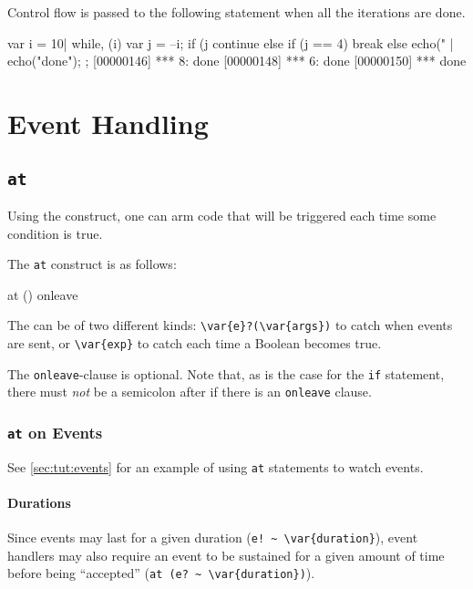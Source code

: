 Control flow is passed to the following statement when all the iterations
are done.

\begin{urbiscript}
{
  var i = 10|
  while, (i)
  {
    var j = --i;
    if (j %
      continue
    else if (j == 4)
      break
    else
      echo("%
  }|
  echo("done");
};
[00000146] *** 8: done
[00000148] *** 6: done
[00000150] *** done
\end{urbiscript}


\section{Event Handling}

\subsection{\lstinline{at}}
\label{sec:lang:at}
Using the  construct, one can arm code that will be
triggered each time some condition is true.

The \lstinline{at} construct is as follows:

\begin{urbiunchecked}
at ()
onleave
\end{urbiunchecked}

The  can be of two different kinds:
\lstinline|\var{e}?(\var{args})| to catch when events are sent, or
\lstinline|\var{exp}| to catch each time a Boolean  becomes true.

The \lstinline{onleave}-clause is optional.  Note that, as is the case for
the \lstinline{if} statement, there must \emph{not} be a semicolon after
 if there is an \lstinline{onleave} clause.

\subsubsection{\lstinline{at} on Events}
See \autoref{sec:tut:events} for an example of using \lstinline{at}
statements to watch events.

\paragraph{Durations}

Since events may last for a given duration
(\lstinline|e! ~ \var{duration}|),
event handlers may also require an event to be sustained for a given amount
of time before being ``accepted'' (\lstinline|at (e? ~ \var{duration})|).

